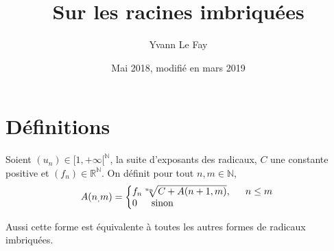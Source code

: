 \documentclass{article}
\begin{document}
\title{Sur les racines imbriquées}
\date{Mai 2018, modifié en mars 2019}
\author{Yvann Le Fay}

\maketitle

\section{Définitions}
Soient $(u_n)\in [1,+\infty[^{\mathbb{N}}$, la suite d'exposants des radicaux, $C$ une constante positive et $(f_n)\in\mathbb{R}^{\mathbb{N}}$.
On définit pour tout $n,m\in\mathbb{N}$, 
\begin{align*}
A(n_,m)=\left\{
     \begin{array}{@{}l@{\thinspace}l}
     f_n \sqrt[u_n]{C+A(n+1,m)}, \indent n\leq m\\
     0 \indent \textup{sinon}
     \end{array}
   \right.   
\end{align*}

Aussi cette forme est équivalente à toutes les autres formes de radicaux imbriquées.
\end{document}
